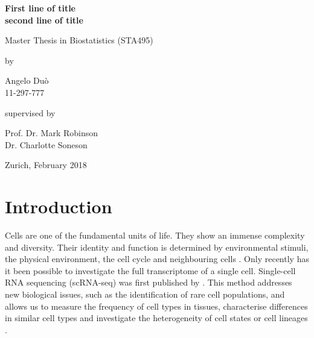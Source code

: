 \documentclass[12pt, a4paper]{article}\usepackage[]{graphicx}\usepackage[]{color}
\begin{document}

\thispagestyle{empty}
\renewcommand{\baselinestretch}{1.5}\normalfont
\begin{center}
\setlength{\parindent}{0cm}
\bf\Large%
First line of title \\
second line of title
\normalfont



\hrulefill

\vspace*{4cm}

\large
Master Thesis in Biostatistics (STA495)
\vspace*{12mm}

by

\vspace*{12mm}

Angelo Du\`o\\
\small 11-297-777\\
\normalfont
\vspace*{4cm}

supervised by

\vspace*{1cm}

Prof. Dr. Mark Robinson\\
Dr. Charlotte Soneson

\vfill

Zurich, February 2018
\end{center}
\renewcommand\familydefault{\rmdefault}%
\renewcommand{\baselinestretch}{1.0}\rm 
\setcounter{page}{0}
\cleardoublepage
\newpage\null\thispagestyle{empty}\newpage
\tableofcontents

\bigskip
\newpage
\section{Introduction}
Cells are one of the fundamental units of life. They show an immense complexity and diversity. Their identity and function is determined by environmental stimuli, the physical environment, the cell cycle and neighbouring cells \citep{wagner2016revealing}. Only recently has it been possible to investigate the full transcriptome of a single cell. Single-cell RNA sequencing (scRNA-seq) was first published by \citet{tang2009mrna}. This method addresses new biological issues, such as the identification of rare cell populations, and allows us to measure the frequency of cell types in tissues, characterise differences in similar cell types and investigate the heterogeneity of cell states or cell lineages \citep{andrews2017identifying}.
\end{document}
